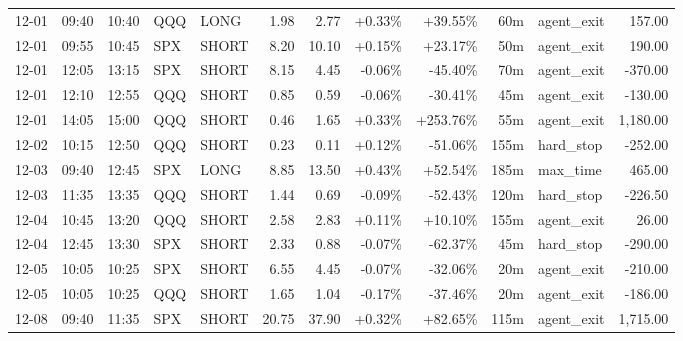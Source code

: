 \documentclass[11pt,a4paper,twoside]{article}
\begin{document}
\begin{center}
\begin{longtable}{>{\color{txtmain}}l l l l l r r r r r >{\color{txtmain}}l r}
12-01 & 09:40 & 10:40 & QQQ & LONG & 1.98 & 2.77 & \textcolor{wingreen}{+0.33\%} & \textcolor{wingreen}{+39.55\%} & 60m & agent\_exit & \textcolor{wingreen}{157.00} \\
12-01 & 09:55 & 10:45 & SPX & SHORT & 8.20 & 10.10 & \textcolor{wingreen}{+0.15\%} & \textcolor{wingreen}{+23.17\%} & 50m & agent\_exit & \textcolor{wingreen}{190.00} \\
12-01 & 12:05 & 13:15 & SPX & SHORT & 8.15 & 4.45 & \textcolor{lossred}{-0.06\%} & \textcolor{lossred}{-45.40\%} & 70m & agent\_exit & \textcolor{lossred}{-370.00} \\
12-01 & 12:10 & 12:55 & QQQ & SHORT & 0.85 & 0.59 & \textcolor{lossred}{-0.06\%} & \textcolor{lossred}{-30.41\%} & 45m & agent\_exit & \textcolor{lossred}{-130.00} \\
12-01 & 14:05 & 15:00 & QQQ & SHORT & 0.46 & 1.65 & \textcolor{wingreen}{+0.33\%} & \textcolor{wingreen}{+253.76\%} & 55m & agent\_exit & \textcolor{wingreen}{1,180.00} \\
12-02 & 10:15 & 12:50 & QQQ & SHORT & 0.23 & 0.11 & \textcolor{wingreen}{+0.12\%} & \textcolor{lossred}{-51.06\%} & 155m & hard\_stop & \textcolor{lossred}{-252.00} \\
12-03 & 09:40 & 12:45 & SPX & LONG & 8.85 & 13.50 & \textcolor{wingreen}{+0.43\%} & \textcolor{wingreen}{+52.54\%} & 185m & max\_time & \textcolor{wingreen}{465.00} \\
12-03 & 11:35 & 13:35 & QQQ & SHORT & 1.44 & 0.69 & \textcolor{lossred}{-0.09\%} & \textcolor{lossred}{-52.43\%} & 120m & hard\_stop & \textcolor{lossred}{-226.50} \\
12-04 & 10:45 & 13:20 & QQQ & SHORT & 2.58 & 2.83 & \textcolor{wingreen}{+0.11\%} & \textcolor{wingreen}{+10.10\%} & 155m & agent\_exit & \textcolor{wingreen}{26.00} \\
12-04 & 12:45 & 13:30 & SPX & SHORT & 2.33 & 0.88 & \textcolor{lossred}{-0.07\%} & \textcolor{lossred}{-62.37\%} & 45m & hard\_stop & \textcolor{lossred}{-290.00} \\
12-05 & 10:05 & 10:25 & SPX & SHORT & 6.55 & 4.45 & \textcolor{lossred}{-0.07\%} & \textcolor{lossred}{-32.06\%} & 20m & agent\_exit & \textcolor{lossred}{-210.00} \\
12-05 & 10:05 & 10:25 & QQQ & SHORT & 1.65 & 1.04 & \textcolor{lossred}{-0.17\%} & \textcolor{lossred}{-37.46\%} & 20m & agent\_exit & \textcolor{lossred}{-186.00} \\
12-08 & 09:40 & 11:35 & SPX & SHORT & 20.75 & 37.90 & \textcolor{wingreen}{+0.32\%} & \textcolor{wingreen}{+82.65\%} & 115m & agent\_exit & \textcolor{wingreen}{1,715.00} \\

\end{longtable}
\end{center}
\end{document}
